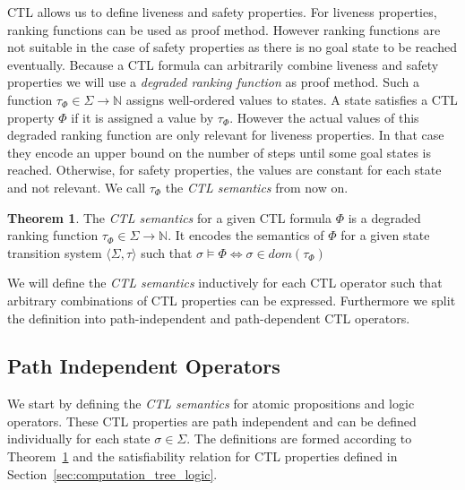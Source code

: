 \documentclass[11pt,a4paper,titlepage]{article}
\theoremstyle{definition}
\newtheorem{theorem}{Theorem}[section]
\begin{document}
CTL allows us to define liveness and safety properties. For liveness properties, ranking functions can be used as proof method. 
However ranking functions are not suitable in the case of safety properties as there is no goal state to be reached eventually. 
Because a CTL formula can arbitrarily combine liveness and safety properties we will use a \textit{degraded ranking function} as proof method. 
Such a function $\tau_\Phi \in \Sigma \rightarrow \mathbb{N}$ assigns well-ordered values to states. 
A state satisfies a CTL property $\Phi$ if it is assigned a value by $\tau_\Phi$. 
However the actual values of this degraded ranking function are only relevant for liveness properties. In that case they encode 
an upper bound on the number of steps until some goal states is reached. 
Otherwise, for safety properties, the values are constant for each state and not relevant. 
We call $\tau_\Phi$ the \textit{CTL semantics} from now on.

\begin{theorem}\label{thr:ctl_semantics}
    The \textit{CTL semantics} for a given CTL formula $\Phi$ is a degraded ranking function 
    $\tau_{\Phi} \in \Sigma \rightarrow \mathbb{N}$. 
    It encodes the semantics of $\Phi$ for a given state transition 
    system $\langle \Sigma, \tau \rangle$ such that 
    $\sigma \models \Phi \iff \sigma \in dom(\tau_{\Phi})$
\end{theorem}

We will define the \textit{CTL semantics} inductively for each CTL operator such that arbitrary 
combinations of CTL properties can be expressed.
Furthermore we split the definition into path-independent and path-dependent CTL operators. 

\subsection{Path Independent Operators}

We start by defining the \textit{CTL semantics} for atomic propositions and logic operators. 
These CTL properties are path independent and can be defined individually for each state $\sigma \in \Sigma$.
The definitions are formed according to Theorem~\ref{thr:ctl_semantics} and the 
satisfiability relation for CTL properties defined in Section~\ref{sec:computation_tree_logic}.\\
\end{document}
